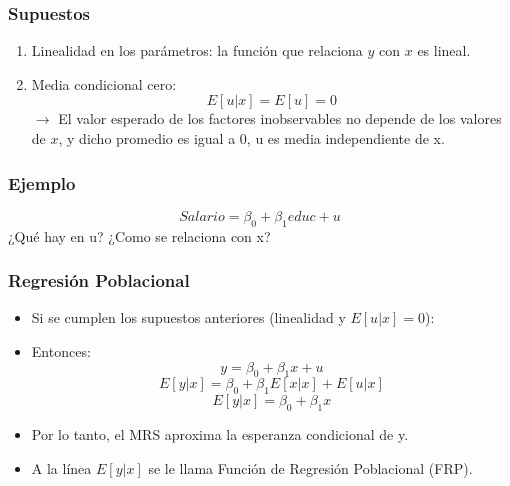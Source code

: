 \documentclass{beamer}
\begin{document}
\begin{frame}
	\frametitle{Supuestos} %
\begin{enumerate}
  \item Linealidad en los parámetros: la función que relaciona $y$ con $x$ es lineal.
  \item Media condicional cero: 
  \begin{equation*}
  E[u|x] = E[u] = 0
  \end{equation*}  
  $\rightarrow$ El valor esperado de los factores inobservables no depende de los valores de $x$, y dicho promedio es igual a 0, {\color{blue} u es media independiente de x.}
\end{enumerate}
\end{frame}	

\begin{frame}
	\frametitle{Ejemplo} %
   \begin{equation*}
    Salario = \beta_0 + \beta_1 educ + u
  \end{equation*}
¿Qu\'e hay en u? ¿Como se relaciona con x?
\end{frame}	

\begin{frame}
	\frametitle{Regresi\'on Poblacional} %
\begin{itemize}
  \item Si se cumplen los supuestos anteriores (linealidad y $E[u|x] = 0$):
  \item Entonces:
  \begin{equation*}
    y = \beta_0 + \beta_1x + u
  \end{equation*}
  \begin{equation*}
    E[y|x] = \beta_0 + \beta_1E[x|x] + E[u|x]
  \end{equation*}
  \begin{equation*}
    E[y|x] = \beta_0 + \beta_1x
  \end{equation*}
  \item Por lo tanto, el MRS aproxima la esperanza condicional de y.
  \item A la línea $E[y|x]$ se le llama Función de Regresión Poblacional (FRP).
\end{itemize}
\end{frame}	
\end{document}
